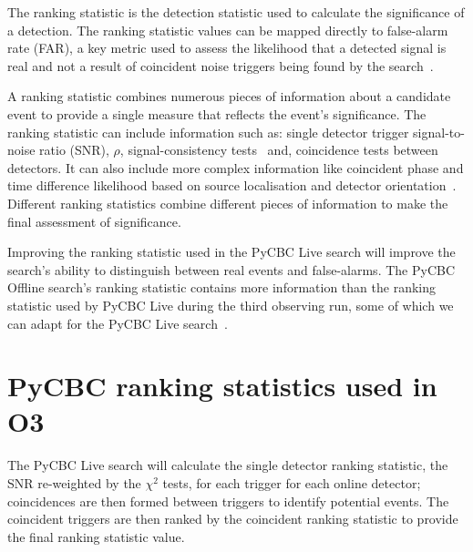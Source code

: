 The ranking statistic is the detection statistic used to calculate the significance of a \gwadj detection. The ranking statistic values can be mapped directly to false-alarm rate (FAR), a key metric used to assess the likelihood that a detected signal is real and not a result of coincident noise triggers being found by the \gwadj search~\cite{PyCBC_global:2020}.

A ranking statistic combines numerous pieces of information about a candidate event to provide a single measure that reflects the event's significance. The ranking statistic can include information such as: single detector trigger signal-to-noise ratio (SNR), $\rho$, signal-consistency tests~\cite{Allen_Chi:2005, rw_snr_eq:2012, PyCBC_sg:2018} and, coincidence tests between detectors. It can also include more complex information like coincident phase and time difference likelihood based on source localisation and detector orientation~\cite{PyCBC:2017, PyCBC_singles:2022}. Different ranking statistics combine different pieces of information to make the final assessment of significance.

Improving the ranking statistic used in the PyCBC Live search will improve the search's ability to distinguish between real \gwadj events and false-alarms. The PyCBC Offline search's ranking statistic contains more information than the ranking statistic used by PyCBC Live during the third observing run, some of which we can adapt for the PyCBC Live search~\cite{PSD_var:2020, PyCBC:2017, PyCBC_global:2020}.

\section{\label{5:sec:previous-stat}PyCBC ranking statistics used in O3}

The PyCBC Live search will calculate the single detector ranking statistic, the SNR re-weighted by the $\chi^{2}$ tests, for each trigger for each online detector; coincidences are then formed between triggers to identify potential \gwadj events. The coincident triggers are then ranked by the coincident ranking statistic to provide the final ranking statistic value. 

